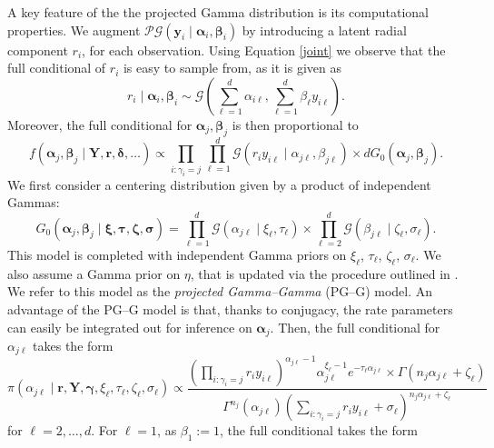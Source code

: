 A key feature of the the projected Gamma distribution is its computational properties. We augment  $\mathcal{PG}(\bm{y}_i\mid\bm{\alpha}_i,\bm{\beta}_i) $ by introducing a latent radial component $r_i$, for each observation. Using Equation \eqref{joint} we observe that the 
full conditional of $r_i$ is easy to sample from, as it is given as
\begin{equation}
    r_i\mid\bm{\alpha}_i,\bm{\beta}_i \sim \mathcal{G}\left(\sum_{\ell = 1}^d\alpha_{i\ell}, \sum_{\ell = 1}^d\beta_{\ell} y_{i\ell}\right).
\end{equation}
Moreover,  the full conditional for $\bm{\alpha}_j,\bm{\beta}_j$ is then proportional to
\begin{equation}
    f(\bm{\alpha}_j,\bm{\beta}_j\mid \bm{Y},\bm{r},\bm{\delta},\ldots) \propto \prod_{i:\gamma_i = j}\prod_{\ell = 1}^d\mathcal{G}\left(r_iy_{i\ell}\mid\alpha_{j\ell},\beta_{j\ell}\right) \times dG_0(\bm{\alpha}_j,\bm{\beta}_j).
\end{equation}
We first consider a centering distribution given by a product of independent Gammas:
\begin{equation*}
    G_0(\bm{\alpha}_j,\bm{\beta}_j\mid \bm{\xi},\bm{\tau},\bm{\zeta},\bm{\sigma}) = \prod_{\ell = 1}^d\mathcal{G}(\alpha_{j\ell}\mid \xi_{\ell},\tau_{\ell})\times\prod_{\ell = 2}^d\mathcal{G}(\beta_{j\ell}\mid\zeta_{\ell},\sigma_{\ell}).
\end{equation*}
This model is completed with independent Gamma priors on $\xi_{\ell}$, $\tau_{\ell}$, $\zeta_{\ell}$, $\sigma_{\ell}$.  We also assume a Gamma prior on $\eta$, that is updated via the procedure outlined in \cite{escobar1995}.  We refer to this model as the \emph{projected Gamma--Gamma} (PG--G) model.  An advantage of the PG--G model is that, thanks to conjugacy, the rate parameters can easily be integrated out for inference on $\bm{\alpha}_j$.  Then, the full conditional for $\alpha_{j\ell}$ takes the form
\begin{equation*}
    \pi(\alpha_{j\ell}\mid \bm{r},\bm{Y},\bm{\gamma},\xi_\ell,\tau_\ell,\zeta_\ell,\sigma_\ell) \propto \frac{\left(\prod_{i:\gamma_i = j}r_iy_{i\ell}\right)^{\alpha_{j\ell} - 1}\alpha_{j\ell}^{\xi_\ell - 1}e^{-\tau_\ell \alpha_{j\ell}}\times\Gamma\left(n_j\alpha_{j\ell} + \zeta_{\ell}\right)}{\Gamma^{n_j}(\alpha_{j\ell})\left(\sum_{i:\gamma_i = j}r_iy_{i\ell} + \sigma_{\ell}\right)^{n_j\alpha_{j\ell} + \zeta_{\ell}}}
\end{equation*}
for $\ell = 2,\ldots,d$.  For $\ell = 1$, as $\beta_{1} := 1$, the full conditional takes the form
